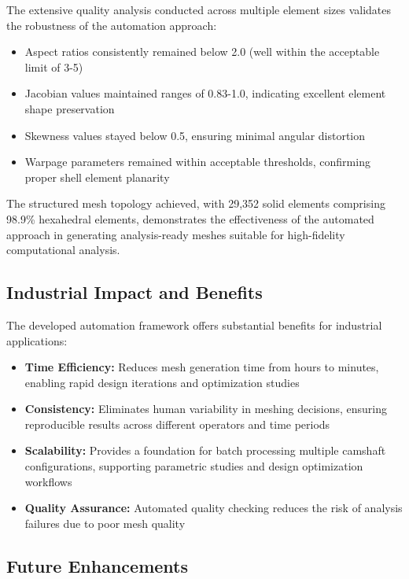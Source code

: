 \documentclass{book}
\begin{document}
\begin{itemize}[leftmargin=*,label=\textbullet]
\begin{itemize}
The extensive quality analysis conducted across multiple element sizes validates the robustness of the automation approach:

\begin{itemize}
    \item Aspect ratios consistently remained below 2.0 (well within the acceptable limit of 3-5)
    \item Jacobian values maintained ranges of 0.83-1.0, indicating excellent element shape preservation
    \item Skewness values stayed below 0.5, ensuring minimal angular distortion
    \item Warpage parameters remained within acceptable thresholds, confirming proper shell element planarity
\end{itemize}

The structured mesh topology achieved, with 29,352 solid elements comprising 98.9\% hexahedral elements, demonstrates the effectiveness of the automated approach in generating analysis-ready meshes suitable for high-fidelity computational analysis.

\subsection{Industrial Impact and Benefits}

The developed automation framework offers substantial benefits for industrial applications:

\begin{itemize}
    \item \textbf{Time Efficiency:} Reduces mesh generation time from hours to minutes, enabling rapid design iterations and optimization studies
    \item \textbf{Consistency:} Eliminates human variability in meshing decisions, ensuring reproducible results across different operators and time periods
    \item \textbf{Scalability:} Provides a foundation for batch processing multiple camshaft configurations, supporting parametric studies and design optimization workflows
    \item \textbf{Quality Assurance:} Automated quality checking reduces the risk of analysis failures due to poor mesh quality
\end{itemize}

\subsection{Future Enhancements}


\end{itemize}
\end{itemize}
\end{document}
